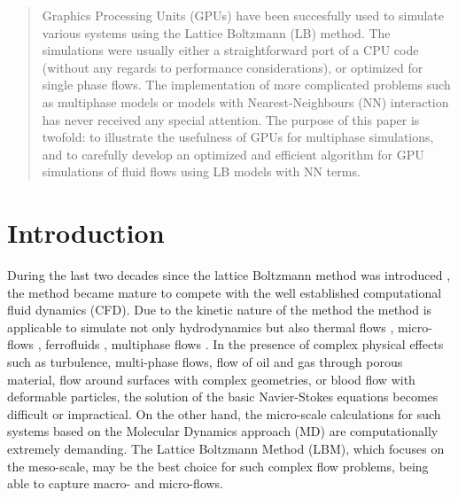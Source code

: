 \documentclass[mathpazo,sort,numbers]{cicp}
\begin{document}
\begin{abstract}
Graphics Processing Units (GPUs) have been succesfully used to simulate
various systems using the Lattice Boltzmann (LB) method.  The simulations were
usually either a straightforward port of a CPU code (without any
regards to performance considerations), or optimized for single phase
flows.  The implementation of more complicated problems such as
multiphase models or models with Nearest-Neighbours (NN) interaction
has never received any special attention.  The purpose of this paper
is twofold: to illustrate the usefulness of GPUs for multiphase simulations,
and to carefully develop an optimized and efficient algorithm for GPU
simulations of fluid flows using LB models with NN terms.
\end{abstract}



\maketitle


\section{Introduction}
\label{sec:introduction}
During the last two decades since the lattice Boltzmann method was introduced \cite{mcnamara}, the
method became mature to compete with the well established computational fluid dynamics (CFD).
Due to the kinetic nature of the method the method is applicable to simulate not only
hydrodynamics but also thermal flows \cite{karlin-minimalmodels,yuan-thermal},
micro-flows \cite{ansumali-small-knudsen}, ferrofluids \cite{rosensweig,kuzmin-aniso},
multiphase flows \cite{rothman-color,Shan-chen:extended,swift}. In the presence of complex
physical effects such as turbulence, multi-phase flows, flow of oil and gas through porous
material, flow around surfaces with complex geometries, or blood flow with deformable
particles, the solution of the basic Navier-Stokes equations becomes difficult or
impractical. On the other hand, the micro-scale calculations for such systems based
on the  Molecular Dynamics approach (MD) are computationally extremely demanding.
The Lattice Boltzmann Method (LBM), which focuses on the meso-scale, may be the best
choice for such complex flow problems, being able to capture macro- and micro-flows.
\end{document}
